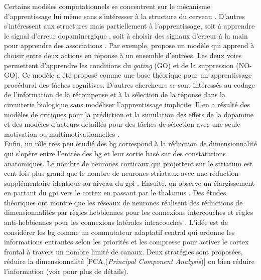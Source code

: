 Certains modèles computationnels se concentrent sur le mécanisme d'apprentissage lui même sans s'intéresser à la structure du cerveau \cite{Perez:2001}. D'autres s'intéressent aux structures mais partiellement à l'apprentissage, soit à apprendre le signal d'erreur dopaminergique \cite{Brown:1999, Barto:1995}, soit à choisir des signaux d'erreur à la main pour apprendre des associations \cite{Frank:2005,Gurney:2001a,Berns:1998}. Par exemple, \cite{Frank:2005} propose un modèle qui apprend à choisir entre deux actions en réponse à un ensemble d'entrées. Les deux voies permettent d'apprendre les conditions du \textit{gating} (GO) et de la suppression (NO-GO). Ce modèle a été proposé comme une base théorique pour un apprentissage procédural des tâches cognitives. D'autres chercheurs se sont intéressés au codage de l'information de la récompense et à la sélection de la réponse dans la circuiterie biologique \cite{Brown:2004,Gurney:2001a,Beiser:1998} sans modéliser l'apprentissage implicite. Il en a résulté des modèles de critiques pour la prédiction et la simulation des effets de la dopamine \cite{Brown:2004} et des modèles d'acteurs détaillés pour des tâches de sélection avec une seule motivation \cite{Frank:2006,Khamassi:2004,Khamassi:2005} ou multimotivationnelles \cite{Dayan:2001,Girard:2008}.\\


Enfin, un rôle très peu étudié des \gls{bg} correspond à la {réduction de dimensionnalité} qui s'opère entre l'entrée des \gls{bg} et leur sortie basé sur des constatations anatomiques. Le nombre de neurones corticaux qui projettent sur le striatum est cent fois plus grand que le nombre de neurones striataux \cite{Kincaid:1998} avec une réduction supplémentaire identique au niveau du \gls{gpi} \cite{Percheron:1994}. Ensuite, on observe un élargissement en partant du \gls{gpi} vers le cortex en passant par le thalamus \cite{Arecchi:1996,Sidibe:1997}. Des études théoriques ont montré que les réseaux de neurones réalisent des réductions de dimensionnalités par règles hebbiennes \cite{Oja:1982} pour les connexions intercouches et règles anti-hebbiennes pour les connexions latérales intracouches \cite{Foldiak:1989}. L'idée est de considérer les \gls{bg} comme un commutateur adaptatif central qui ordonne les informations entrantes selon les priorités et les compresse pour activer le cortex frontal à travers un nombre limité de canaux. Deux stratégies sont proposées, réduire la dimensionnalité [PCA,(\textit{Principal Component Analysis})] ou bien réduire l'information (voir \cite{Bar:2003} pour plus de détails). \\


